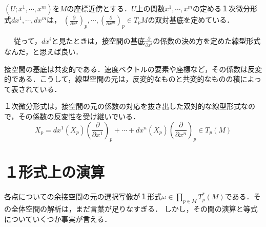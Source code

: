 \documentclass[uplatex, dvipdfmx]{jsreport}
\begin{document}
\begin{proposition}
    $(U;x^1,\cdots,x^m)$を$M$の座標近傍とする．$U$上の関数$x^1,\cdots,x^m$の定める１次微分形式$dx^1,\cdots,dx^m$は，
    $\left(\frac{\partial}{\partial x^1}\right)_p, \cdots, \left(\frac{\partial}{\partial x^m}\right)_p\in T_pM$の双対基底を定めている．
\end{proposition}
\begin{remark}　
    従って，$dx^i$と見たときは，接空間の基底$\frac{\partial}{\partial x^i}$の係数の決め方を定めた線型形式なんだ，と思えば良い．

    接空間の基底は共変的である．速度ベクトルの要素や座標など，その係数は反変的である．こうして，線型空間の元は，反変的なものと共変的なものの積によって表されている．

    １次微分形式は，接空間の元の係数の対応を抜き出した双対的な線型形式なので，その係数の反変性を受け継いでいる．
    \[ X_p=dx^1(X_p)\left(\frac{\partial}{\partial x^1}\right)_p+\cdots +dx^n(X_p)\left(\frac{\partial}{\partial x^n}\right)_p \in T_p(M) \]
\end{remark}

\section{１形式上の演算}
各点についての余接空間の元の選択写像が１形式$\omega\in\prod_{p\in M} T_p^*(M)$である．その全体空間の解析は，まだ言葉が足りなすぎる．
しかし，その間の演算と等式についていくつか事実が言える．
\end{document}
